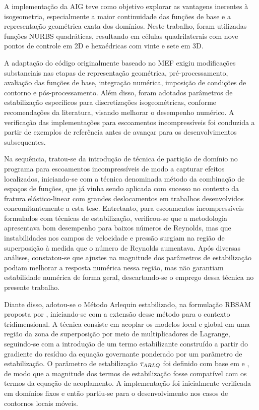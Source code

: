 A implementação da AIG teve como objetivo explorar as vantagens inerentes à isogeometria, especialmente a maior continuidade das funções de base e a representação geométrica exata dos domínios. Neste trabalho, foram utilizadas funções NURBS quadráticas, resultando em células quadrilaterais com nove pontos de controle em 2D e hexaédricas com vinte e sete em 3D.

A adaptação do código originalmente baseado no MEF exigiu modificações substanciais nas etapas de representação geométrica, pré-processamento, avaliação das funções de base, integração numérica, imposição de condições de contorno e pós-processamento. Além disso, foram adotados parâmetros de estabilização específicos para discretizações isogeométricas, conforme recomendações da literatura, visando melhorar o desempenho numérico. A verificação das implementações para escoamentos incompressíveis foi conduzida a partir de exemplos de referência antes de avançar para os desenvolvimentos subsequentes.

Na sequência, tratou-se da introdução de técnica de partição de domínio no programa para escoamentos incompressíveis de modo a capturar efeitos localizados, iniciando-se com a técnica denominada método da combinação de espaços de funções, que já vinha sendo aplicada com sucesso no contexto da fratura elástico-linear com grandes deslocamentos
em trabalhos desenvolvidos concomitantemente a esta tese.
Entretanto, para escoamentos incompressíveis formulados com técnicas de estabilização, verificou-se que a metodologia apresentava bom desempenho para baixos números de Reynolds, mas que instabilidades nos campos de velocidade e pressão surgiam na região de superposição à medida que o número de Reynolds aumentava. Após diversas análises, constatou-se que ajustes na magnitude dos parâmetros de estabilização podiam melhorar a resposta numérica nessa região, mas não garantiam estabilidade numérica de forma geral, descartando-se o emprego dessa técnica no presente trabalho.

Diante disso, adotou-se o Método Arlequin estabilizado, na formulação RBSAM proposta por , iniciando-se com a extensão desse método para o contexto tridimensional. A técnica consiste em acoplar os modelos local e global em uma região da zona de superposição por meio de multiplicadores de Lagrange, seguindo-se com a introdução de um termo estabilizante construído a partir do gradiente do resíduo da equação governante ponderado por um parâmetro de estabilização. O parâmetro de estabilização $\tau_{ARLQ}$ foi definido com base em  e , de modo que a magnitude dos termos de estabilização fosse compatível com os termos da equação de acoplamento. A implementação foi inicialmente verificada em domínios fixos e então partiu-se para o desenvolvimento nos casos de contornos locais móveis.

